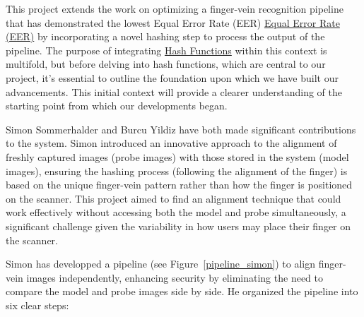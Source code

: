 This project extends the work on optimizing a finger-vein recognition pipeline that has demonstrated the lowest Equal Error Rate (EER) \hyperref[def:EER]{Equal Error Rate (EER)} by incorporating a novel hashing step to process the output of the pipeline. The purpose of integrating \hyperref[def:Hash_Function]{Hash Functions} within this context is multifold, but before delving into hash functions, which are central to our project, it's essential to outline the foundation upon which we have built our advancements. This initial context will provide a clearer understanding of the starting point from which our developments began.

Simon Sommerhalder and Burcu Yildiz have both made significant contributions to the system. Simon introduced an innovative approach to the alignment of freshly captured images (probe images) with those stored in the system (model images), ensuring the hashing process (following the alignment of the finger) is based on the unique finger-vein pattern rather than how the finger is positioned on the scanner. This project aimed to find an alignment technique that could work effectively without accessing both the model and probe simultaneously, a significant challenge given the variability in how users may place their finger on the scanner.

Simon has developped a pipeline (see Figure~\ref{pipeline_simon}) to align finger-vein images independently, enhancing security by eliminating the need to compare the model and probe images side by side. He organized the pipeline into six clear steps:

